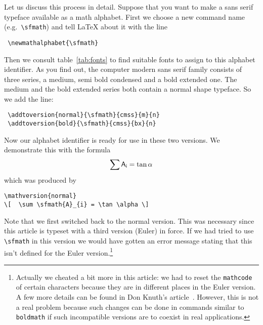  Let us discuss this process in detail. Suppose that
 you want to make a sans serif typeface available as a
 math alphabet. First we choose a new command name
 (e.g.\ \verb+\sfmath+) and tell \LaTeX{} about it with
 the line
\begin{verbatim}
 \newmathalphabet{\sfmath}
\end{verbatim}
 Then we consult table~\ref{tab:fonts} to find suitable
 fonts to assign to this alphabet identifier.  As you
 find out, the computer modern sans serif family
 consists of three series, a medium, semi bold
 condensed and a bold extended one. The medium and the
 bold extended series both contain a normal shape
 typeface. So we add the line:
\begin{verbatim}
 \addtoversion{normal}{\sfmath}{cmss}{m}{n}
 \addtoversion{bold}{\sfmath}{cmss}{bx}{n}
\end{verbatim}
Now our alphabet identifier is ready for use in these two versions.
We demonstrate this with the formula
{ \resetmathcodes
\[  \sum \sf{A}_{i} = \tan \alpha \]}%
which was produced by
\begin{verbatim}
\mathversion{normal}
\[  \sum \sfmath{A}_{i} = \tan \alpha \]
\end{verbatim}
 Note that we first switched back to the normal version. This was
 necessary since this article is typeset with a third version (Euler)
 in force. If we had tried to use \verb+\sfmath+ in this version
 we would have gotten an error message stating that this
 isn't defined for the Euler version.\footnote{Actually we cheated a
 bit more in this article: we had to reset the {\tt\bslash mathcode}
 of certain characters because they are in different places in the
 Euler version.  A few more details can be found in Don Knuth's
 article~\protect\cite{art:euler}. However, this is not a real problem
 because such changes can be done in commands similar to {\tt\bslash
 boldmath} if such incompatible versions are to coexist in real
 applications.}

